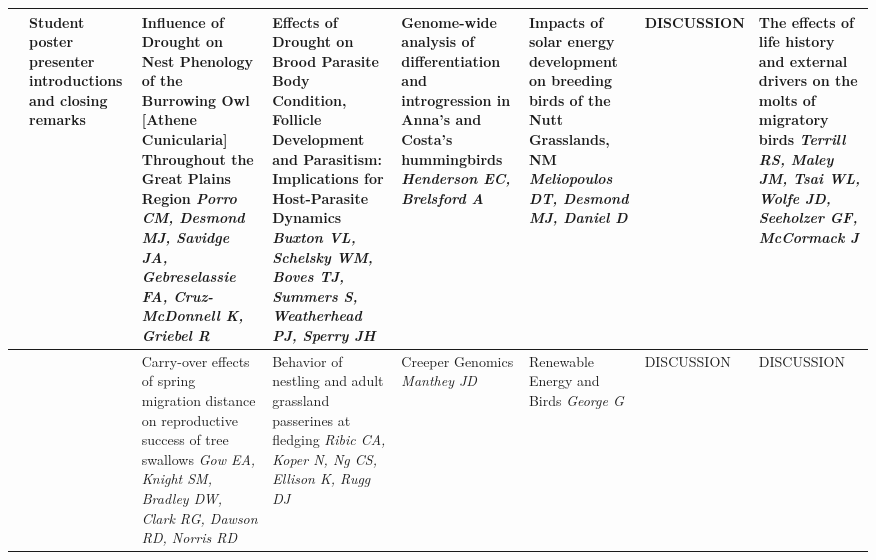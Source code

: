 \begin{tabular}{|x{0.85cm}|a{2.85cm}|x{2.85cm}|x{2.85cm}|x{2.85cm}|a{2.85cm}|a{2.85cm}|a{2.85cm}|}
& \newline \newline \textit{} Student poster presenter introductions and closing remarks \newline \newline \textit{} & Influence of Drought on Nest Phenology of the Burrowing Owl [Athene Cunicularia] Throughout the Great Plains Region \newline \newline \textit{Porro CM, Desmond MJ, Savidge JA, Gebreselassie FA, Cruz-McDonnell K, Griebel R} & Effects of Drought on Brood Parasite Body Condition, Follicle Development and Parasitism: Implications for Host-Parasite Dynamics \newline \newline \textit{Buxton VL, Schelsky WM, Boves TJ, Summers S, Weatherhead PJ, Sperry JH} & Genome-wide analysis of differentiation and introgression in Anna's and Costa's hummingbirds \newline \newline \textit{Henderson EC, Brelsford A} & Impacts of solar energy development on breeding birds of the Nutt Grasslands, NM \newline \newline \textit{Meliopoulos DT, Desmond MJ, Daniel D} & DISCUSSION \newline \newline \textit{} & The effects of life history and external drivers on the molts of migratory birds \newline \newline \textit{Terrill RS, Maley JM, Tsai WL, Wolfe JD, Seeholzer GF, McCormack J}\\
\hline
{}& \newline \newline \textit{} & Carry-over effects of spring migration distance on reproductive success of tree swallows \newline \newline \textit{Gow EA, Knight SM, Bradley DW, Clark RG, Dawson RD, Norris RD} & Behavior of nestling and adult grassland passerines at fledging \newline \newline \textit{Ribic CA, Koper N, Ng CS, Ellison K, Rugg DJ} & Creeper Genomics \newline \newline \textit{Manthey JD} & Renewable Energy and Birds \newline \newline \textit{George G} & DISCUSSION \newline \newline \textit{} & DISCUSSION \newline \newline \textit{}\\
\hline
\end{tabular}
